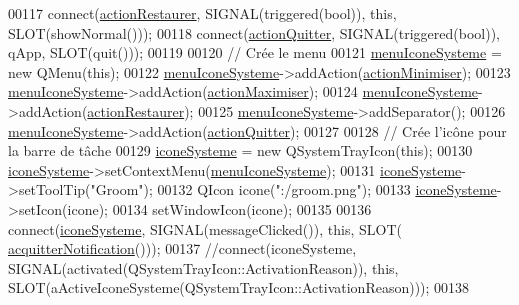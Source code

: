 \begin{DoxyCode}
00117     connect(\hyperlink{class_ihm_groom_aa2df6badfa16f802411b502228fb8704}{actionRestaurer}, SIGNAL(triggered(\textcolor{keywordtype}{bool})), \textcolor{keyword}{this}, SLOT(showNormal()));
00118     connect(\hyperlink{class_ihm_groom_ab28c091688d25e93b2baf99b4aa90f07}{actionQuitter}, SIGNAL(triggered(\textcolor{keywordtype}{bool})), qApp, SLOT(quit()));
00119 
00120     \textcolor{comment}{// Crée le menu}
00121     \hyperlink{class_ihm_groom_af2abf22a1a9203af547f32c7edb13710}{menuIconeSysteme} = \textcolor{keyword}{new} QMenu(\textcolor{keyword}{this});
00122     \hyperlink{class_ihm_groom_af2abf22a1a9203af547f32c7edb13710}{menuIconeSysteme}->addAction(\hyperlink{class_ihm_groom_a4018ccf7f73329725e4c54002ae72f01}{actionMinimiser});
00123     \hyperlink{class_ihm_groom_af2abf22a1a9203af547f32c7edb13710}{menuIconeSysteme}->addAction(\hyperlink{class_ihm_groom_aa23dc46d5e223aa20bb84b5bd99d3b81}{actionMaximiser});
00124     \hyperlink{class_ihm_groom_af2abf22a1a9203af547f32c7edb13710}{menuIconeSysteme}->addAction(\hyperlink{class_ihm_groom_aa2df6badfa16f802411b502228fb8704}{actionRestaurer});
00125     \hyperlink{class_ihm_groom_af2abf22a1a9203af547f32c7edb13710}{menuIconeSysteme}->addSeparator();
00126     \hyperlink{class_ihm_groom_af2abf22a1a9203af547f32c7edb13710}{menuIconeSysteme}->addAction(\hyperlink{class_ihm_groom_ab28c091688d25e93b2baf99b4aa90f07}{actionQuitter});
00127 
00128     \textcolor{comment}{// Crée l'icône pour la barre de tâche}
00129     \hyperlink{class_ihm_groom_a9ca0929cf284a9a2e3e2bc3489249919}{iconeSysteme} = \textcolor{keyword}{new} QSystemTrayIcon(\textcolor{keyword}{this});
00130     \hyperlink{class_ihm_groom_a9ca0929cf284a9a2e3e2bc3489249919}{iconeSysteme}->setContextMenu(\hyperlink{class_ihm_groom_af2abf22a1a9203af547f32c7edb13710}{menuIconeSysteme});
00131     \hyperlink{class_ihm_groom_a9ca0929cf284a9a2e3e2bc3489249919}{iconeSysteme}->setToolTip(\textcolor{stringliteral}{"Groom"});
00132     QIcon icone(\textcolor{stringliteral}{":/groom.png"});
00133     \hyperlink{class_ihm_groom_a9ca0929cf284a9a2e3e2bc3489249919}{iconeSysteme}->setIcon(icone);
00134     setWindowIcon(icone);
00135 
00136     connect(\hyperlink{class_ihm_groom_a9ca0929cf284a9a2e3e2bc3489249919}{iconeSysteme}, SIGNAL(messageClicked()), \textcolor{keyword}{this}, SLOT(
      \hyperlink{class_ihm_groom_a428ffaecbab91abb0824ad61afd3109e}{acquitterNotification}()));
00137     \textcolor{comment}{//connect(iconeSysteme, SIGNAL(activated(QSystemTrayIcon::ActivationReason)), this,
       SLOT(aActiveIconeSysteme(QSystemTrayIcon::ActivationReason)));}
00138 

\end{DoxyCode}
